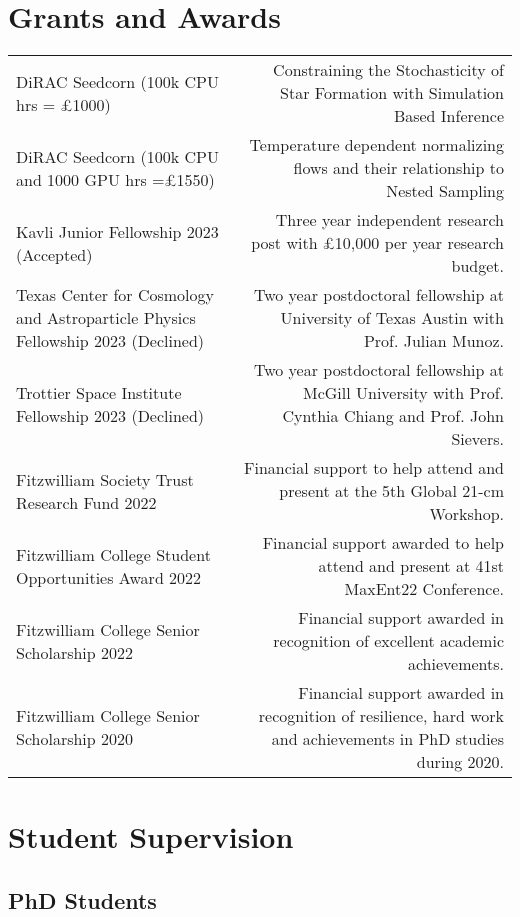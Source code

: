 \documentclass{article}
\begin{document}
\section*{Grants and Awards}

\begin{tabular}{l!{\vrule}r}
    DiRAC Seedcorn (100k CPU hrs = £1000) & Constraining the Stochasticity of Star Formation with Simulation Based Inference \\
    DiRAC Seedcorn (100k CPU and 1000 GPU hrs =£1550) & Temperature dependent normalizing flows and their relationship to Nested Sampling \\
    Kavli Junior Fellowship 2023 (Accepted) & Three year independent research post with £10,000 per year research budget. \\
    Texas Center for Cosmology and Astroparticle Physics Fellowship 2023 (Declined) & Two year postdoctoral fellowship at University of Texas Austin with Prof. Julian Munoz. \\
    Trottier Space Institute Fellowship 2023 (Declined) & Two year postdoctoral fellowship at McGill University with Prof. Cynthia Chiang and Prof. John Sievers. \\
    Fitzwilliam Society Trust Research Fund 2022 & Financial support to help attend and present at the 5th Global 21-cm Workshop. \\
	Fitzwilliam College Student Opportunities Award 2022 & Financial support awarded to help attend and present at 41st MaxEnt22 Conference. \\
	Fitzwilliam College Senior Scholarship 2022 & Financial support awarded in recognition of excellent academic achievements. \\
	Fitzwilliam College Senior Scholarship 2020 & Financial support awarded in recognition of resilience, hard work and achievements in PhD studies during 2020.
\end{tabular}

\section*{Student Supervision}

\subsection*{PhD Students}
\end{document}
